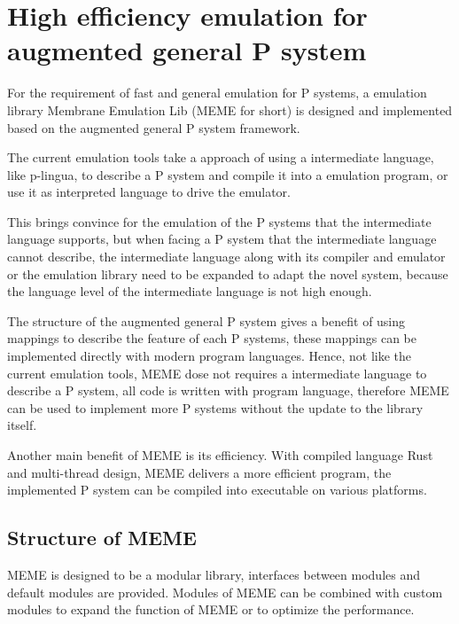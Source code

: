 \documentclass[9pt,a4paper,twoside]{article}
\begin{document}
    \section{High efficiency emulation for augmented general P system}

    For the requirement of fast and general emulation for P systems, a emulation library Membrane Emulation Lib (MEME for short) is designed and implemented based on the augmented general P system framework.

    The current emulation tools take a approach of using a intermediate language, like p-lingua, to describe a P system and compile it into a emulation program, or use it as interpreted language to drive the emulator. 
    
    This brings convince for the emulation of the P systems that the intermediate language supports, but when facing a P system that the intermediate language cannot describe, the intermediate language along with its compiler and emulator or the emulation library need to be expanded to adapt the novel system, because the language level of the intermediate language is not high enough.

    The structure of the augmented general P system gives a benefit of using mappings to describe the feature of each P systems, these mappings can be implemented directly with modern program languages. Hence, not like the current emulation tools, MEME dose not requires a intermediate language to describe a P system, all code is written with program language, therefore MEME can be used to implement more P systems without the update to the library itself.

    Another main benefit of MEME is its efficiency. With compiled language Rust and multi-thread design, MEME delivers a more efficient program, the implemented P system can be compiled into executable on various platforms.

    \subsection{Structure of MEME}
    MEME is designed to be a modular library, interfaces between modules and default modules are provided. Modules of MEME can be combined with custom modules to expand the function of MEME or to optimize the performance. 
\end{document}
